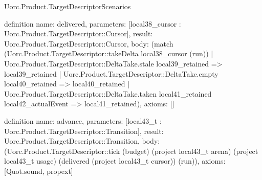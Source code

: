 \begin{lexlean}{Uorc.Product.TargetDescriptorScenarios}
\begin{semanticmodule}
definition{
  name: delivered,
  parameters: [local38_cursor : Uorc.Product.TargetDescriptor::Cursor],
  result: Uorc.Product.TargetDescriptor::Cursor,
  body: (match (Uorc.Product.TargetDescriptor::takeDelta local38_cursor (run))
    | Uorc.Product.TargetDescriptor::DeltaTake.stale local39_retained => local39_retained
    | Uorc.Product.TargetDescriptor::DeltaTake.empty local40_retained => local40_retained
    | Uorc.Product.TargetDescriptor::DeltaTake.taken local41_retained local42_actualEvent => local41_retained),
  axioms: []
}

definition{
  name: advance,
  parameters: [local43_t : Uorc.Product.TargetDescriptor::Transition],
  result: Uorc.Product.TargetDescriptor::Transition,
  body: (Uorc.Product.TargetDescriptor::tick (budget) (project local43_t arena) (project local43_t usage) (delivered (project local43_t cursor)) (run)),
  axioms: [Quot.sound, propext]
}


\end{semanticmodule}
\end{lexlean}
